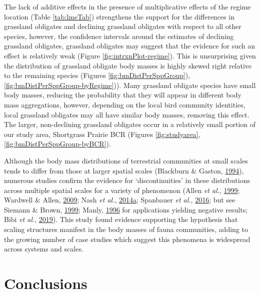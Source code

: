 \documentclass[12pt,twoside,openany]{reedthesis}
\begin{document}
The lack of additive effects in the presence of multiplicative effects of the regime location (Table \ref{tab:lmeTab}) strengthens the support for the differences in grassland obligates and declining grassland obligates with respect to all other species, however, the confidence intervals around the estimates of declining grassland obligates, grassland obligates may suggest that the evidence for such an effect is relatively weak (Figure \ref{fig:intrxnPlot-regime}). This is unsurprising given the distribution of grassland obligate body masses is highly skewed right relative to the remaining species (Figures \ref{fig:bmDistPerSppGroup}), \ref{fig:bmDistPerSppGroup-byRegime})). Many grassland obligate species have small body masses, reducing the probability that they will appear in different body mass aggregations, however, depending on the local bird community identities, local grassland obligates may all have similar body masses, removing this effect. The larger, non-declining grassland obligates occur in a relatively small portion of our study area, Shortgrass Prairie BCR (Figures \ref{fig:studyarea},\ref{fig:bmDistPerSppGroup-byBCR}).

Although the body mass distributions of terrestrial communities at small scales tends to differ from those at larger spatial scales (Blackburn \& Gaston, \protect\hyperlink{ref-blackburn1994animal}{1994}), numerous studies confirm the evidence for `discontinuities' in these distributions across multiple spatial scales for a variety of phenomenon (Allen \emph{et al.}, \protect\hyperlink{ref-allen1999body}{1999}; Wardwell \& Allen, \protect\hyperlink{ref-wardwell2009variability}{2009}; Nash \emph{et al.}, \protect\hyperlink{ref-nash2014discontinuities}{2014}\protect\hyperlink{ref-nash2014discontinuities}{a}; Spanbauer \emph{et al.}, \protect\hyperlink{ref-spanbauer2016body}{2016}; but see Siemann \& Brown, \protect\hyperlink{ref-siemann1999gaps}{1999}; Manly, \protect\hyperlink{ref-manly1996there}{1996} for applications yielding negative results; Bibi \emph{et al.}, \protect\hyperlink{ref-bibi2019body}{2019}). This study found evidence supporting the hypothesis that scaling structures manifest in the body masses of fauna communities, adding to the growing number of case studies which suggest this phenomena is widespread across systems and scales.

\hypertarget{conclusions}{%
\chapter{Conclusions}\label{conclusions}}
\end{document}

